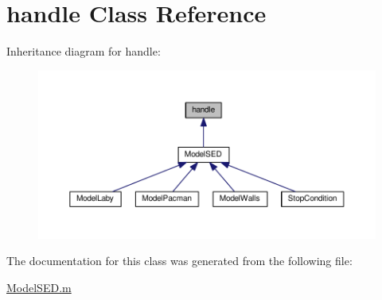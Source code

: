 \hypertarget{classhandle}{}\section{handle Class Reference}
\label{classhandle}


Inheritance diagram for handle\+:\nopagebreak
\begin{figure}[H]
\begin{center}
\leavevmode
\includegraphics[width=350pt]{classhandle__inherit__graph}
\end{center}
\end{figure}


The documentation for this class was generated from the following file\+:\begin{DoxyCompactItemize}
\item 
\hyperlink{_model_s_e_d_8m}{Model\+S\+E\+D.\+m}\end{DoxyCompactItemize}
